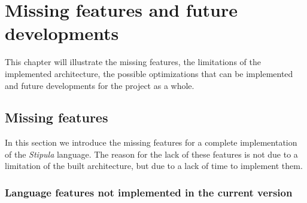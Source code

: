 
\chapter{Missing features and future developments}
\label{cap:future-developments}

This chapter will illustrate the missing features, the limitations of the implemented architecture, the 
possible optimizations that can be implemented and future developments for the project as a whole.


\section{Missing features}

In this section we introduce the missing features for a complete implementation of the \textit{Stipula} 
language. The reason for the lack of these features is not due to a limitation of the built architecture, 
but due to a lack of time to implement them.

\subsection{Language features not implemented in the current version}

